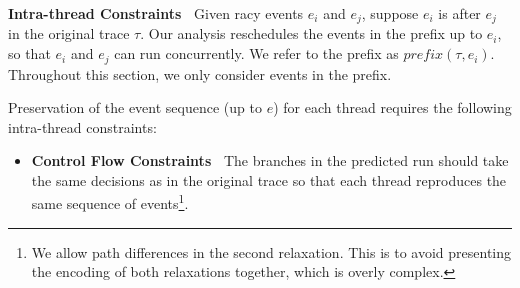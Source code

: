 {\bf Intra-thread Constraints\ } Given racy events $e_i$ and $e_j$, suppose 
$e_i$ is after $e_j$ in the original trace $\tau$. Our analysis reschedules 
the events in the prefix up to $e_i$, so that $e_i$ and $e_j$ can run 
concurrently. We refer to the prefix as $prefix(\tau, e_i)$. Throughout 
this section, we only consider events in the prefix. 

Preservation of the event sequence (up to $e$) for each thread requires 
the following intra-thread constraints:

\begin{itemize}
\item {\bf Control Flow Constraints\ } The branches in the predicted run 
should take the same decisions as in the original trace so that each thread 
reproduces the same sequence of events\footnote{We allow path differences in
the second relaxation. This is to avoid presenting the encoding
of both relaxations together, which is overly complex.}.


\end{itemize}
